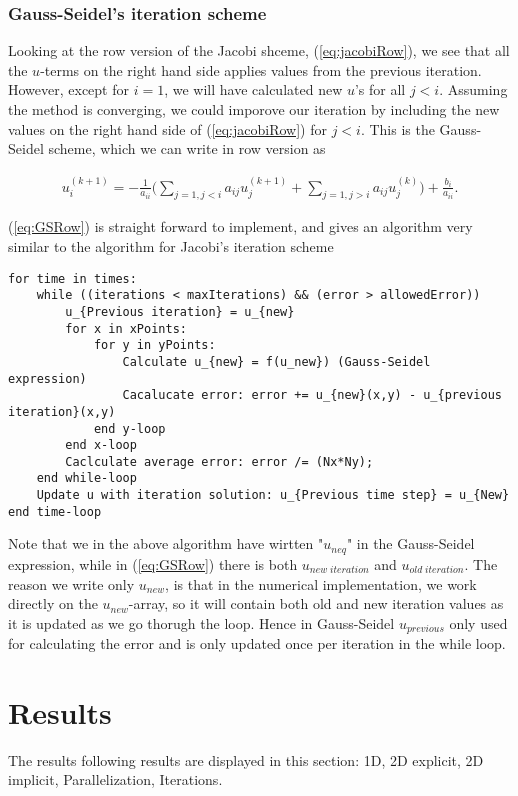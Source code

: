 \documentclass{article}
\begin{document}
\subsubsection{Gauss-Seidel's iteration scheme}
Looking at the row version of the Jacobi shceme, (\ref{eq:jacobiRow}), we see that all the $u$-terms on the right hand side applies values from the previous iteration. However, except for $i=1$, we will have calculated new $u$'s for all $j < i$. Assuming the method is converging, we could imporove our iteration by including the new values on the right hand side of (\ref{eq:jacobiRow}) for $j<i$. This is the Gauss-Seidel scheme, which we can write in row version as

\begin{subequations}\label{eq:GSRow}
	\begin{align}
	u_i^{(k+1)} = - \frac{1}{a_{ii}} \Big(\sum_{j=1,j < i} a_{ij} u_j^{(k+1)} + \sum_{j=1,j > i} a_{ij} u_j^{(k)}\Big)+ \frac{b_i}{a_{ii}}.
	\end{align}
\end{subequations}

(\ref{eq:GSRow}) is straight forward to implement, and gives an algorithm very similar to the algorithm for Jacobi's iteration scheme

\begin{lstlisting}
for time in times:
	while ((iterations < maxIterations) && (error > allowedError))
		u_{Previous iteration} = u_{new}
		for x in xPoints:
			for y in yPoints:
				Calculate u_{new} = f(u_new}) (Gauss-Seidel expression)
				Cacalucate error: error += u_{new}(x,y) - u_{previous iteration}(x,y)
			end y-loop
		end x-loop
		Caclculate average error: error /= (Nx*Ny);
	end while-loop
	Update u with iteration solution: u_{Previous time step} = u_{New}
end time-loop
\end{lstlisting}

Note that we in the above algorithm have wirtten "$u_{neq}$" in the Gauss-Seidel expression, while in (\ref{eq:GSRow}) there is both $u_{new\; iteration}$
and $u_{old\; iteration}$. The reason we write only $u_{new}$, is that in the numerical implementation, we work directly on the $u_{new}$-array, so it will contain both old and new iteration values as it is updated as we go thorugh the loop. Hence  in Gauss-Seidel $u_{previous}$ only used for calculating the error and is only updated once per iteration in the while loop.

\section{Results}
The results following results are displayed in this section: 1D, 2D explicit, 2D implicit, Parallelization, Iterations.
\end{document}
